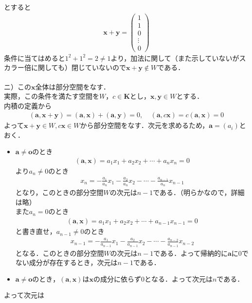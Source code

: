 \documentclass[dvipdfmx,uplatex,11pt]{jsarticle}
\begin{document}
とすると
\begin{eqnarray*}
\bm{x}+\bm{y}=
\begin{pmatrix}
1 \\
1 \\
0 \\
\vdots \\
0
\end{pmatrix}
\end{eqnarray*}
条件に当てはめると$1^2+1^2=2 \neq 1$より，加法に関して（また示していないがスカラー倍に関しても）閉じていないので$\bm{x}+\bm{y} \not\in W$である．\\
\dotfill \\
ニ）この$\bm{x}全体$は部分空間をなす．$実際，この条件を満たす空間をW，c \in \bm{K}とし，\bm{x,y} \in W$とする．\\
内積の定義から
\begin{eqnarray*}
(\bm{a},\bm{x}+\bm{y})=(\bm{a},\bm{x})+(\bm{a},\bm{y})=0 ,~~~~~(\bm{a},c\bm{x})=c(\bm{a},\bm{x})=0
\end{eqnarray*}
よって$\bm{x}+\bm{y} \in W, c\bm{x} \in W$から部分空間をなす．次元を求めるため，$\bm{a}=(a_{i})$とおく．
\begin{itemize}
\item $\bm{a} \neq \bm{o}のとき$
\begin{eqnarray*}
(\bm{a},\bm{x})=a_1x_1+a_2x_2+ \cdots +a_nx_n=0
\end{eqnarray*}
より$a_n \neq 0$のとき
\begin{eqnarray*}
x_n=-\frac{a_1}{a_n}x_{1}-\frac{a_2}{a_n}x_{2}- \cdots -\frac{a_{n-1}}{a_n}x_{n-1}
\end{eqnarray*}
となり，このときの部分空間$Wの次元はn-1$である．（明らかなので，詳細は略）\\
また$a_n=0$のとき
\begin{eqnarray*}
(\bm{a},\bm{x})=a_1x_1+a_2x_2+ \cdots +a_{n-1}x_{n-1}=0
\end{eqnarray*}
と書き直せ，$a_{n-1} \neq 0$のとき
\begin{eqnarray*}
x_{n-1}=-\frac{a_1}{a_{n-1}}x_{1}-\frac{a_2}{a_{n-1}}x_{2}- \cdots -\frac{a_{n-2}}{a_{n-1}}x_{n-2}
\end{eqnarray*}
となる．このときの部分空間$Wの次元はn-1である．$よって帰納的に$\bm{a}$に0でない成分が存在するとき，次元は$n-1$である．\\
\item $\bm{a} \neq \bm{o}のとき，(\bm{a},\bm{x})は\bm{x}の成分に依らず0となる．よって次元はnである．$
\end{itemize}
よって次元は
\end{document}

